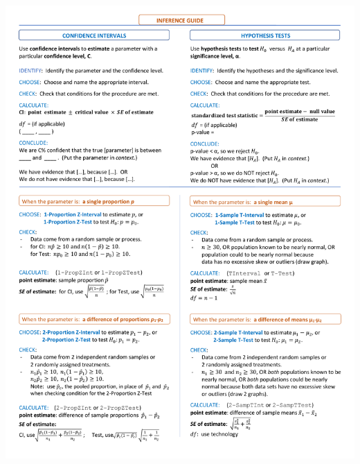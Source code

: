 
\begin{center}
\includegraphics[height=9.3in]{extraTeX/inferenceGuide/figures/inference_guide1}
\end{center}

